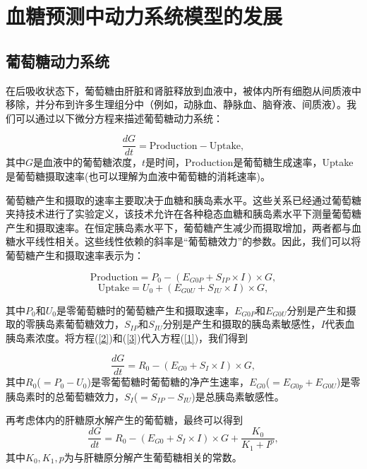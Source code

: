 \chapter{血糖预测中动力系统模型的发展}
\section{葡萄糖动力系统}
在后吸收状态下，葡萄糖由肝脏和肾脏释放到血液中，被体内所有细胞从间质液中移除，并分布到许多生理组分中（例如，动脉血、静脉血、脑脊液、间质液）。我们可以通过以下微分方程来描述葡萄糖动力系统\cite{bergman1979quantitative}：

\begin{equation}\label{1}
    \frac{dG}{dt} = \text{Production} - \text{Uptake},
\end{equation}
其中$G$是血液中的葡萄糖浓度，$t$是时间，Production是葡萄糖生成速率，Uptake是葡萄糖摄取速率(也可以理解为血液中葡萄糖的消耗速率)。

葡萄糖产生和摄取的速率主要取决于血糖和胰岛素水平。这些关系已经通过葡萄糖夹持技术进行了实验定义，该技术允许在各种稳态血糖和胰岛素水平下测量葡萄糖产生和摄取速率\cite{bergman1985assessment}。在恒定胰岛素水平下，葡萄糖产生减少而摄取增加，两者都与血糖水平线性相关\cite{best1981glucose}。这些线性依赖的斜率是“葡萄糖效力”的参数。因此，我们可以将葡萄糖产生和摄取速率表示为：

\begin{equation}\label{2}
    \text{Production} = P_0 -(E_{G0P} + S_{IP} \times I) \times G,
\end{equation}
\begin{equation}\label{3}
    \text{Uptake} = U_0 + (E_{G0U} + S_{IU} \times I) \times G,
\end{equation}

其中$P_0$和$U_0$是零葡萄糖时的葡萄糖产生和摄取速率，\(E_{G0P}\)和\(E_{G0U}\)分别是产生和摄取的零胰岛素葡萄糖效力，\(S_{IP}\)和\(S_{IU}\)分别是产生和摄取的胰岛素敏感性，$I$代表血胰岛素浓度。将方程(\ref{2})和(\ref{3})代入方程(\ref{1})，我们得到

\begin{equation}
    \frac{dG}{dt} = R_0 -(E_{G0} + S_I \times I) \times G,
\end{equation}
其中$R_0$($=P_0-U_0$)是零葡萄糖时葡萄糖的净产生速率，\(E_{G0}\)($=E_{G0p}+E_{G0U}$)是零胰岛素时的总葡萄糖效力，\(S_I\)($=S_{IP}-S_{IU}$)是总胰岛素敏感性\cite{topp2000model}。

再考虑体内的肝糖原水解产生的葡萄糖，最终可以得到
\begin{equation}
    \frac{dG}{dt} = R_0 -(E_{G0} + S_I \times I) \times G+\frac{K_0}{K_1+I^p},
\end{equation}
其中$K_0,K_1,p$为与肝糖原分解产生葡萄糖相关的常数\cite{bridgewater2020amplitude}。
